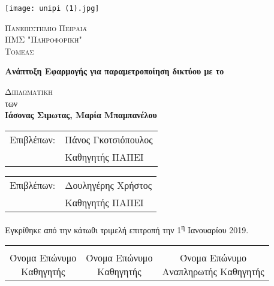            \begin{center}
	
	       \vspace*{-1cm}

    \texttt{[image: unipi (1).jpg]}
        
    \Large
    \textsc{Πανεπιστήμιο Πειραιά}\\
    \large
    \textsc{ΠΜΣ "Πληροφορική" }\\
    \textsc{Τομεας}
    
    \vspace{1.5cm}
	
	\Huge
    \textbf{Ανάπτυξη Εφαρμογής για παραμετροποίηση δικτύου με το }
        
    \vspace{1.5cm}
    \Large
    \textsc{Διπλωματικη }\\
    των\\

    \LARGE
    \textbf{Ιάσονας Σιμωτας, Μαρία Μπαμπανέλου}
    
    \vfill
    \end{center}
    
    \begin{tabular}{ll}
		Επιβλέπων: & Πάνος Γκοτσιόπουλος \\
		 & Καθηγητής ΠΑΠΕΙ
	\end{tabular}

    \begin{tabular}{ll}
		Επιβλέπων: & Δουληγέρης Χρήστος \\
		 & Καθηγητής ΠΑΠΕΙ
	\end{tabular}
	
	\vspace{1.5cm}
    
    Εγκρίθηκε από την κάτωθι τριμελή επιτροπή την 1\textsuperscript{η} Ιανουαρίου 2019.
    
    \vspace{1.5cm}
	
	\begin{center}
	\noindent\begin{tabular}{ccc}
		\makebox[0.3\textwidth]{\hrulefill} & 
		\makebox[0.3\textwidth]{\hrulefill} & 
		\makebox[0.3\textwidth]{\hrulefill} \\

		\specialcell{Όνομα Επώνυμο \\ Καθηγητής} & 
		\specialcell{Όνομα Επώνυμο \\ Καθηγητής} & 
		\specialcell{Όνομα Επώνυμο \\ Αναπληρωτής Καθηγητής} \\ [8ex]%
	\end{tabular}
	\end{center}